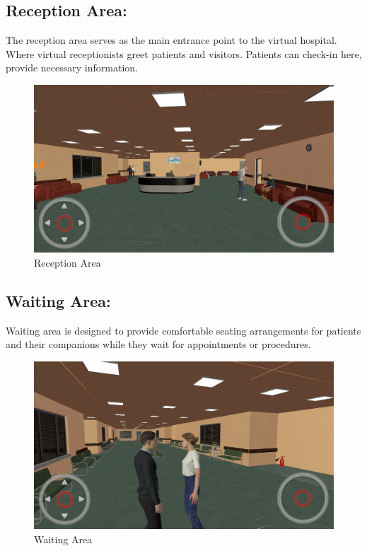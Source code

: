 \subsection{Reception Area:}
The reception area serves as the main entrance point to the virtual hospital. Where virtual receptionists greet patients and visitors. Patients can check-in here, provide necessary information.
\begin{figure}[h]
	\centering
	\includegraphics[width=0.7\linewidth]{Images/Reception Area.png}
	\caption{Reception Area}
	\label{fig:system-diagram}
\end{figure}
\newline

\subsection{Waiting Area:}	
Waiting area is designed to provide comfortable seating arrangements for patients and their companions while they wait for appointments or procedures.
\begin{figure}[h]
		\centering
		\includegraphics[width=0.7\linewidth]{Images/Waiting Area.png}
		\caption{Waiting Area}
\end{figure}
\\
